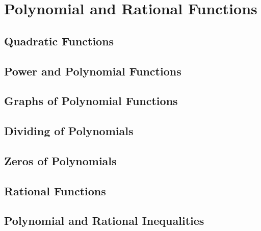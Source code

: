 
\chapter{Polynomial and Rational Functions}

\section{Quadratic Functions}

\section{Power and Polynomial Functions}

\section{Graphs of Polynomial Functions}

\section{Dividing of Polynomials}

\section{Zeros of Polynomials}

\section{Rational Functions}

\section{Polynomial and Rational Inequalities}



